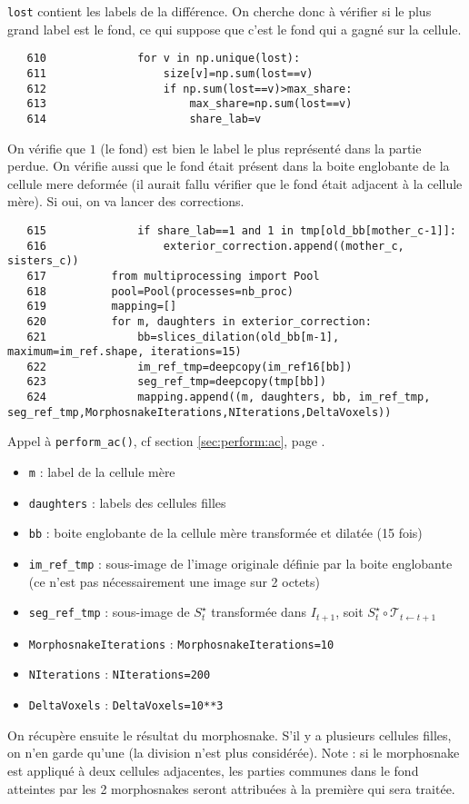 \documentclass{article}
\def \mycolor {red}
\begin{document}
\color{\mycolor}
\verb|lost|  contient  les labels de la diff\'erence. On cherche donc \`a v\'erifier si le plus grand label est le fond, ce qui suppose que c'est le fond qui a gagn\'e sur la cellule.
\color{black}
\begin{verbatim}
   610	            for v in np.unique(lost):
   611	                size[v]=np.sum(lost==v)
   612	                if np.sum(lost==v)>max_share:
   613	                    max_share=np.sum(lost==v)
   614	                    share_lab=v
\end{verbatim} 
\color{\mycolor}
On v\'erifie que $1$ (le fond) est bien le label le plus repr\'esent\'e dans la partie perdue. On v\'erifie aussi que le fond \'etait pr\'esent dans la boite englobante de la cellule mere deform\'ee (il aurait fallu v\'erifier que le fond \'etait adjacent \`a la cellule m\`ere). Si oui, on va lancer des corrections.
\color{black}
\begin{verbatim}
   615	            if share_lab==1 and 1 in tmp[old_bb[mother_c-1]]:
   616	                exterior_correction.append((mother_c, sisters_c))
   617	        from multiprocessing import Pool
   618	        pool=Pool(processes=nb_proc)
   619	        mapping=[]
   620	        for m, daughters in exterior_correction:
   621	            bb=slices_dilation(old_bb[m-1], maximum=im_ref.shape, iterations=15)
   622	            im_ref_tmp=deepcopy(im_ref16[bb])
   623	            seg_ref_tmp=deepcopy(tmp[bb])
   624	            mapping.append((m, daughters, bb, im_ref_tmp, seg_ref_tmp,MorphosnakeIterations,NIterations,DeltaVoxels))
\end{verbatim} 
\color{\mycolor}
Appel \`a \texttt{perform\_ac()}, cf section \ref{sec:perform:ac}, page \pageref{sec:perform:ac}.
\begin{itemize}
\itemsep -0.5ex
\item \verb|m| : label de la cellule m\`ere 
\item \verb|daughters| : labels des cellules filles
\item \verb|bb| : boite englobante de la cellule m\`ere transform\'ee et dilat\'ee (15 fois)
\item \verb|im_ref_tmp| : sous-image de l'image originale d\'efinie par la boite englobante (ce n'est pas n\'ecessairement une image sur 2 octets)
\item \verb|seg_ref_tmp| : sous-image de $S^{\star}_t$ transform\'ee dans $I_{t+1}$, soit $S^{\star}_t \circ \mathcal{T}_{t \leftarrow t+1}$
\item \verb|MorphosnakeIterations| : \verb|MorphosnakeIterations=10|
\item \verb|NIterations| : \verb|NIterations=200|
\item \verb|DeltaVoxels| : \verb|DeltaVoxels=10**3|
\end{itemize}
On r\'ecup\`ere ensuite le r\'esultat du morphosnake. S'il y a plusieurs cellules filles, on n'en garde qu'une (la division n'est plus consid\'er\'ee). Note : si le morphosnake est appliqu\'e \`a deux cellules adjacentes, les parties communes dans le fond atteintes par les 2 morphosnakes seront attribu\'ees \`a la premi\`ere qui sera trait\'ee.
\end{document}
